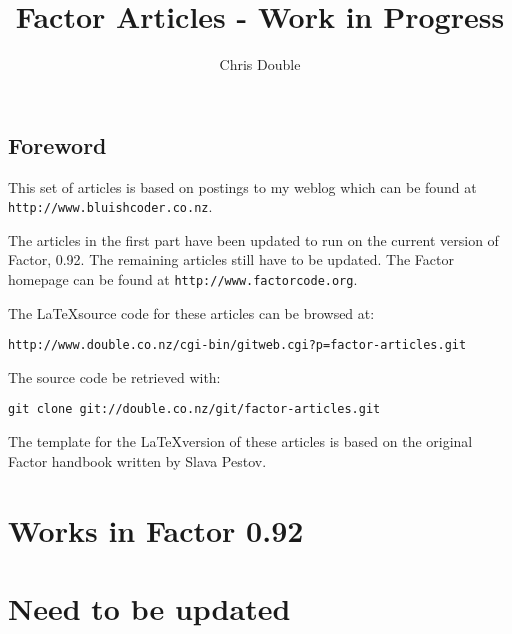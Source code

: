 \documentclass{book}
\begin{document}
\title{Factor Articles - Work in Progress}

\author{Chris Double}

\maketitle
\tableofcontents{}

\chapter*{Foreword}

This set of articles is based on postings to my weblog which can be found at \verb|http://www.bluishcoder.co.nz|.

The articles in the first part have been updated to run on the current version of Factor, 0.92. The remaining articles still have to be updated. The Factor homepage can be found at \verb|http://www.factorcode.org|.

The \LaTeX source code for these articles can be browsed at:
\begin{verbatim}
http://www.double.co.nz/cgi-bin/gitweb.cgi?p=factor-articles.git
\end{verbatim}

The source code be retrieved with:
\begin{verbatim}
git clone git://double.co.nz/git/factor-articles.git
\end{verbatim}

The template for the \LaTeX version of these articles is based on the original Factor handbook written by Slava Pestov.

\part{Works in Factor 0.92}




\part{Need to be updated}
















\end{document}
